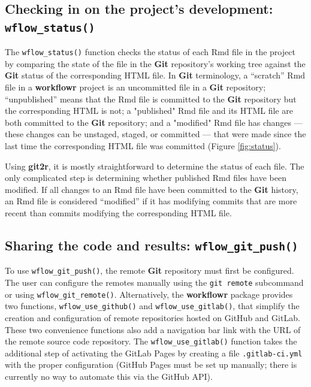 \documentclass[9pt,a4paper]{extarticle}
\begin{document}
\subsection*{Checking in on the project's development: \texttt{wflow\_status()}}

The \texttt{wflow\_status()} function checks the status of each Rmd file in the
project by comparing the state of the file in the \textbf{Git} repository's
working tree against the \textbf{Git} status of the corresponding HTML file. In
 \textbf{Git} terminology, a “scratch” Rmd file in a \textbf{workflowr} project is an
uncommitted file in a \textbf{Git} repository; “unpublished” means that the Rmd
file is committed to the \textbf{Git} repository but the corresponding HTML is
not; a "published" Rmd file and its HTML file are both committed to the
 \textbf{Git} repository; and a "modified" Rmd file has changes --- these changes
can be unstaged, staged, or committed --- that were made since the last
time the corresponding HTML file was committed (Figure \ref{fig:status}).

Using \textbf{git2r}, it is mostly straightforward to determine the status of
each file. The only complicated step is determining whether published
Rmd files have been modified. If all changes to an Rmd file have been
committed to the \textbf{Git} history, an Rmd file is considered “modified” if it
has modifying commits that are more recent than commits modifying the
corresponding HTML file.

\subsection*{Sharing the code and results: \texttt{wflow\_git\_push()}}

To use \texttt{wflow\_git\_push()}, the remote \textbf{Git} repository must first be
configured. The user can configure the remotes manually using the
\texttt{git remote} subcommand or using \texttt{wflow\_git\_remote()}.
Alternatively, the \textbf{workflowr} package provides two functions,
\texttt{wflow\_use\_github()} and \texttt{wflow\_use\_gitlab()}, that simplify the creation
and configuration of remote repositories hosted on GitHub and GitLab.
These two convenience functions also add a navigation bar link with the
URL of the remote source code repository. The \texttt{wflow\_use\_gitlab()}
function takes the additional step of activating the GitLab Pages by
creating a file \texttt{.gitlab-ci.yml} with the proper configuration
(GitHub Pages must be set up manually; there is currently no way to
automate this via the GitHub API).
\end{document}
